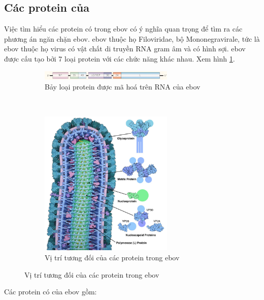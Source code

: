 \documentclass[12pt,a4paper,reqno, oneside]{book}
\begin{document}
\subsection{Các protein của }

	Việc tìm hiểu các protein có trong \gls{ebov} có ý nghĩa quan trọng để tìm ra các phương án ngăn chặn \gls{ebov}.
	\Gls{ebov} thuộc họ Filoviridae, bộ Mononegravirale, tức là \gls{ebov} thuộc họ virus có vật chất di truyền RNA gram âm và có hình sợi\cite{Kuhn2010}. \Gls{ebov} được cấu tạo bởi 7 loại protein với các chức năng khác nhau\cite{Huang2002}. Xem hình \ref{fig:encode}.
	\begin{figure}[h]
	\centering
	\begin{subfigure}{\textwidth}
	\centering
	\includegraphics[width=0.7\textwidth,natwidth=610,natheight=642]{dsRNA_encode}
	\caption{Bảy loại protein được mã hoá trên RNA của \gls{ebov}}
	\label{fig:encode}
	\end{subfigure}\\
	\begin{subfigure}{\textwidth}
	\centering
	\includegraphics[width=0.7\textwidth,natwidth=610,natheight=642]{virion}
	\caption{Vị trí tương đối của các protein trong \gls{ebov}}
	\label{fig:ebola_proteins}
	\end{subfigure}
	\end{figure}
	Các protein có của \gls{ebov} gồm:
\end{document}
